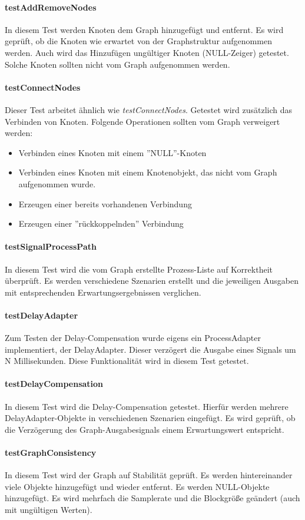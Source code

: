 \paragraph{testAddRemoveNodes} 
In diesem Test werden Knoten dem Graph hinzugefügt und entfernt. Es wird geprüft, ob die Knoten wie erwartet von der Graphstruktur aufgenommen werden. Auch wird das Hinzufügen ungültiger Knoten (NULL-Zeiger) getestet. Solche Knoten sollten nicht vom Graph aufgenommen werden.  
\paragraph{testConnectNodes}
Dieser Test arbeitet ähnlich wie \emph{testConnectNodes}. Getestet wird zusätzlich das Verbinden von Knoten. Folgende Operationen sollten vom Graph verweigert werden:
\begin{itemize}
	\item Verbinden eines Knoten mit einem ''NULL''-Knoten
	\item Verbinden eines Knoten mit einem Knotenobjekt, das nicht vom Graph aufgenommen wurde.
	\item Erzeugen einer bereits vorhandenen Verbindung
	\item Erzeugen einer ''rückkoppelnden'' Verbindung
\end{itemize}
\paragraph{testSignalProcessPath}
In diesem Test wird die vom Graph erstellte Prozess-Liste auf Korrektheit überprüft. Es werden verschiedene Szenarien erstellt und die jeweiligen Ausgaben mit entsprechenden Erwartungsergebnissen verglichen.
\paragraph{testDelayAdapter}
Zum Testen der Delay-Compensation wurde eigens ein ProcessAdapter implementiert, der DelayAdapter. Dieser verzögert die Ausgabe eines Signals um N Millisekunden. Diese Funktionalität wird in diesem Test getestet.
\paragraph{testDelayCompensation}
In diesem Test wird die Delay-Compensation getestet. Hierfür werden mehrere DelayAdapter-Objekte in verschiedenen Szenarien eingefügt. Es wird geprüft, ob die Verzögerung des Graph-Ausgabesignals einem Erwartungswert entspricht.
\paragraph{testGraphConsistency}
In diesem Test wird der Graph auf Stabilität geprüft. Es werden hintereinander viele Objekte hinzugefügt und wieder entfernt. Es werden NULL-Objekte hinzugefügt. Es wird mehrfach die Samplerate und die Blockgröße geändert (auch mit ungültigen Werten).
